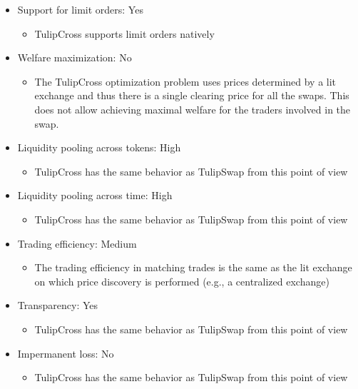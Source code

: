 \documentclass[11pt, reqno]{amsart}
\theoremstyle{definition}
\theoremstyle{remark}
\begin{document}
\begin{itemize}
    \item Support for limit orders: Yes
          \begin{itemize}
              \item TulipCross supports limit orders natively
          \end{itemize}
    \item Welfare maximization: No
          \begin{itemize}
              \item The TulipCross optimization problem uses prices determined by
                    a lit exchange and thus there is a single clearing price for all
                    the swaps. This does not allow achieving maximal welfare for
                    the traders involved in the swap.
          \end{itemize}
    \item Liquidity pooling across tokens: High
          \begin{itemize}
              \item TulipCross has the same behavior as TulipSwap from this point of view
          \end{itemize}
    \item Liquidity pooling across time: High
          \begin{itemize}
              \item TulipCross has the same behavior as TulipSwap from this point of view
          \end{itemize}
    \item Trading efficiency: Medium
          \begin{itemize}
              \item The trading efficiency in matching trades is the same as the
                    lit exchange on which price discovery is performed (e.g., a
                    centralized exchange)
          \end{itemize}
    \item Transparency: Yes
          \begin{itemize}
              \item TulipCross has the same behavior as TulipSwap from this point of view
          \end{itemize}
    \item Impermanent loss: No
          \begin{itemize}
              \item TulipCross has the same behavior as TulipSwap from this point of view

\end{itemize}
\end{itemize}
\end{document}

